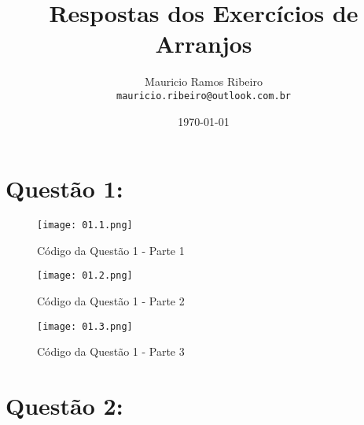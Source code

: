 \documentclass{article}
\author{
  Mauricio Ramos Ribeiro\\
  \texttt{mauricio.ribeiro@outlook.com.br}
}
\title{Respostas dos Exercícios de Arranjos}
\date{\today}
\begin{document}
\maketitle

\vspace{15mm}


\section*{Questão 1:}

\begin{figure}[h!]
  \texttt{[image: 01.1.png]}
  \caption{Código da Questão 1 - Parte 1}
\end{figure}
\begin{figure}[h!]
\texttt{[image: 01.2.png]}
\caption{Código da Questão 1 - Parte 2}
\end{figure}
\begin{figure}[h!]
\texttt{[image: 01.3.png]}
\caption{Código da Questão 1 - Parte 3}
\end{figure}
\vspace{15mm}

\section*{Questão 2:}

\vspace{15mm}
\end{document}
